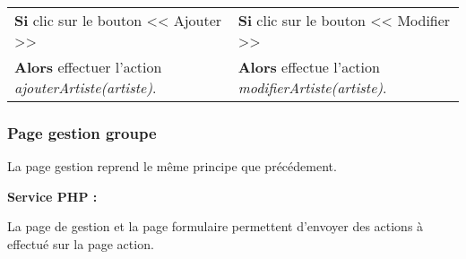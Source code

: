        \newpage
            
            \begin{center}
                \begin{tabular}{l | l}
                    \textbf{Si} clic sur le bouton << Ajouter >> & \textbf{Si} clic sur le bouton << Modifier >> \\
                    \textbf{Alors} effectuer l'action \emph{ajouterArtiste(artiste)}. & \textbf{Alors} effectue l'action \emph{modifierArtiste(artiste)}.
                \end{tabular}
            \end{center}
            
			

    \clearpage

		\subsubsection{Page gestion groupe}

			\begin{paragraphe}
                La page gestion reprend le même principe que précédement. 
			\end{paragraphe}

			\begin{paragraphe}
				\textbf{Service PHP :}
			\end{paragraphe}
            
            \begin{paragraphe}
                La page de gestion et la page formulaire permettent d'envoyer des actions à effectué sur la page action.
			\end{paragraphe}

